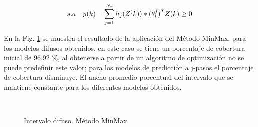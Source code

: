\documentclass[12pt]{article}
\begin{document}
\begin{itemize}
\begin{equation}
\notag s.a \quad y(k)-\sum_{j=1}^{N_r}h_j(Z^(k))*(\theta_l^j)^TZ(k) \geq 0
\label{e_MaxMinsa1}
\end{equation}

En la Fig. \ref{f_P1MinMax} se muestra el resultado de la aplicación del Método MinMax, para los modelos difusos obtenidos, en este caso se tiene un porcentaje de cobertura inicial de 96.92 \%, al obtenerse a partir de un algoritmo de optimización no se puede predefinir este valor; para los modelos de predicción a j-pasos el porcentaje de cobertura disminuye. El ancho promedio porcentual del intervalo que se mantiene constante para los diferentes modelos obtenidos.

\begin{figure}[t!]
		\centering
		\captionsetup{justification=centering}
        \\
		\caption{Intervalo difuso. Método MinMax}
		\label{f_P1MinMax}
\end{figure}







\end{itemize}
\end{document}
